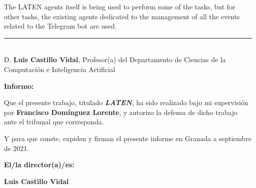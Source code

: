 	The LATEN agents itself is being used to perform some of the tasks, but for other tasks, the existing agents dedicated to the management of all the events related to the Telegram bot are used.\\

\cleardoublepage

\thispagestyle{empty}

\noindent\rule[-1ex]{\textwidth}{2pt}\\[4.5ex]

D. \textbf{Luis Castillo Vidal}, Profesor(a) del Departamento de Ciencias de la Computación e Inteligencia Artificial

\vspace{0.5cm}

\textbf{Informo:}

\vspace{0.5cm}

Que el presente trabajo, titulado \textit{\textbf{LATEN}},
ha sido realizado bajo mi supervisión por \textbf{Francisco Domínguez Lorente}, y autorizo la defensa de dicho trabajo ante el tribunal
que corresponda.

\vspace{0.5cm}

Y para que conste, expiden y firman el presente informe en Granada a septiembre de 2021.

\vspace{1cm}

\textbf{El/la director(a)/es: }

\vspace{5cm}

\noindent \textbf{Luis Castillo Vidal}